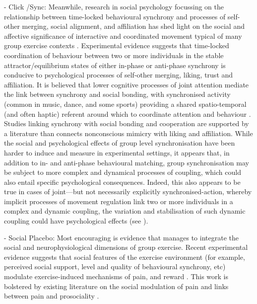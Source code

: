 \documentclass[12pt]{report}
\begin{document}
- Click /Sync:
Meanwhile, research in social psychology focussing on the relationship between time-locked behavioural synchrony and processes of self-other merging, social alignment, and affiliation has shed light on the social and affective significance of interactive and coordinated movement typical of many group exercise contexts \cite{Wiltermuth2009,Kirschner2010,Reddish2013,Tuncgenc2016}. Experimental evidence suggests that time-locked coordination of behaviour between two or more individuals in the stable attractor/equilibrium states of either in-phase or anti-phase synchrony is conducive to psychological processes of self-other merging, liking, trust and affiliation.  It is believed that lower cognitive processes of joint attention mediate the link between synchrony and social bonding, with synchronised activity (common in music, dance, and some sports) providing a shared spatio-temporal (and often haptic) referent around which to coordinate attention and behaviour \cite{Launay2016,Wolf2015}.  Studies linking synchrony with social bonding and cooperation are supported by a literature than connects nonconscious mimicry with liking and affiliation\citep{VanBaaren2009}.  While the social and psychological effects of group level synchronisation have been harder to induce and measure in experimental settings, it appears that, in addition to in- and anti-phase behavioural matching, group synchronisation may be subject to more complex and dynamical processes of coupling, which could also entail specific psychological consequences.  Indeed, this also appears to be true in cases of joint—but not necessarily explicitly synchronised-action, whereby implicit processes of movement regulation link two or more individuals in a complex and dynamic coupling, the variation and stabilisation of such dynamic coupling could have psychological effects (see \cite{Schmidt2008,Marsh2009a}).


- Social Placebo:
Most encouraging is evidence that manages to integrate the social and neurophysiological dimensions of group exercise.  Recent experimental evidence suggests that social features of the exercise environment (for example, perceived social support, level and quality of behavioural synchrony, etc) modulate exercise-induced mechanisms of pain, and reward \citep{Cohen2009,Sullivan2014,Tarr2015,Davis2015,Weinstein2016}. This work is bolstered by existing literature on the social modulation of pain \citep{Eisenberger2012a} and links between pain and prosociality \citep{Bastian2014a}.
\end{document}
